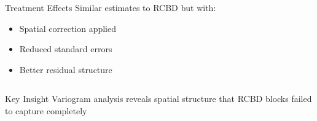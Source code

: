 \documentclass[aspectratio=43]{beamer}
\begin{document}
\begin{frame}
\begin{columns}[T]
\begin{column}{0.5\textwidth}
            \begin{block}{Treatment Effects}
                Similar estimates to RCBD but with:
                \begin{itemize}
                    \item Spatial correction applied
                    \item Reduced standard errors
                    \item Better residual structure
                \end{itemize}
            \end{block}
        \end{column}
    \end{columns}
    
    \vspace{1em}
    
    \begin{exampleblock}{Key Insight}
        Variogram analysis reveals spatial structure that RCBD blocks failed to capture completely
    \end{exampleblock}
\end{frame}
\end{document}
